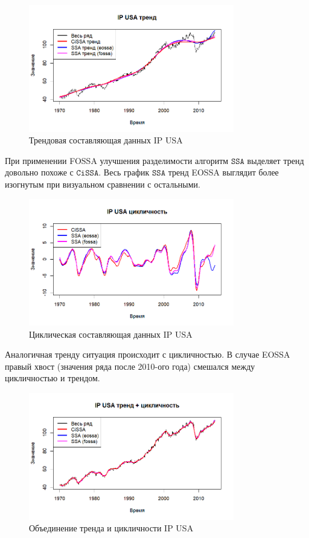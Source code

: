 \documentclass[12pt, specialist, subf
]{disser}
\theoremstyle{definition}
\newcommand{\SSA}{\texttt{SSA}}
\newcommand{\CISSA}{\texttt{CiSSA}}
\begin{document}
\begin{figure}[H]
	\centering
	\includegraphics[width=0.8\textwidth]{img/trend inseparability example/IP_trend.png}
	\caption{Трендовая составляющая данных IP USA}
	\label{fig:IP_trend}
\end{figure}

При применении FOSSA улучшения разделимости алгоритм $\SSA$ выделяет тренд довольно похоже с $\CISSA$. Весь график $\SSA$ тренд EOSSA выглядит более изогнутым при визуальном сравнении с остальными.

\begin{figure}[H]
	\centering
	\includegraphics[width=0.8\textwidth]{img/trend inseparability example/IP_cycle.png}
	\caption{Циклическая составляющая данных IP USA}
	\label{fig:IP_cycle}
\end{figure}

Аналогичная тренду ситуация происходит с цикличностью. В случае EOSSA правый хвост (значения ряда после 2010-ого года) смешался между цикличностью и трендом.

\begin{figure}[H]
	\centering
	\includegraphics[width=0.8\textwidth]{img/trend inseparability example/IP_trend_sycle.png}
	\caption{Объединение тренда и цикличности IP USA}
	\label{fig:IP_trend_sycle}
\end{figure}
\end{document}
